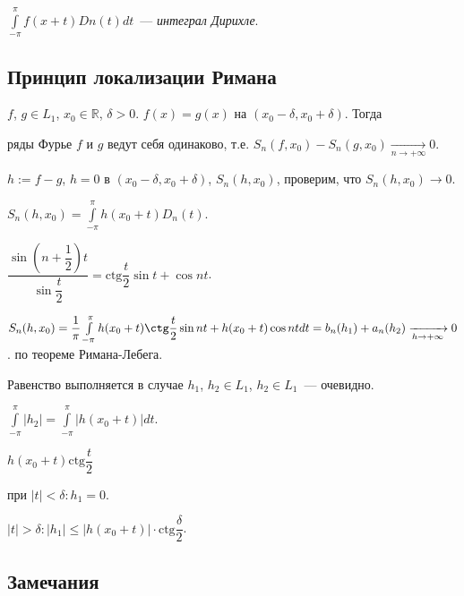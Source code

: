\documentclass{article}
\begin{document}
        $\int\limits^{\pi}_{-\pi} f(x + t) Dn(t) dt$~--- \textit{интеграл Дирихле}.
        
    \subsection{Принцип локализации Римана}
    
        $f$, $g \in L_1$, $x_0 \in \mathbb{R}$, $\delta > 0$. $f(x) = g(x)$ на $(x_0 - \delta, x_0 + \delta)$. Тогда
        
        ряды Фурье $f$ и $g$ ведут себя одинаково, т.е. $S_n(f, x_0) - S_n(g, x_0) \xrightarrow[n \rightarrow +\infty]{} 0$.
        
        $h := f - g$, $h = 0$ в $(x_0 - \delta, x_0 + \delta)$, $S_n(h, x_0)$, проверим, что $S_n(h, x_0) \rightarrow 0$.
        
        $S_n(h, x_0) = \int\limits^{\pi}_{-\pi} h(x_0 + t) D_n(t)$.
        
        $\dfrac{\sin \left(n + \dfrac{1}{2} \right) t}{\sin \dfrac{t}{2}} = \mathrm{ctg} \dfrac{t}{2} \sin{t} + \cos {nt}$.
        
        $S_n(h, x_0) = \dfrac{1}{\pi} \int\limits^{\pi}_{-\pi} h(x_0 + t) \ctg \dfrac{t}{2} \sin {nt} + h(x_0 + t) \cos {nt} dt = b_n(h_1) + a_n(h_2) \xrightarrow[h \rightarrow +\infty]{} 0$. по теореме Римана-Лебега.
        
        Равенство выполняется в случае $h_1$, $h_2 \in L_1$, $h_2 \in L_1$~--- очевидно.
        
        $\int\limits^{\pi}_{-\pi} |h_2| = \int\limits^{\pi}_{-\pi} | h(x_0 + t) | dt$.
        
        $h(x_0 + t) \mathrm{ctg} \dfrac{t}{2}$
        
        при $|t| < \delta : h_1 = 0$.
        
        $|t| > \delta : |h_1| \leqslant |h(x_0 + t)| \cdot \mathrm{ctg} \dfrac{\delta}{2}$.
        
    \subsection{Замечания}
    
\end{document}
